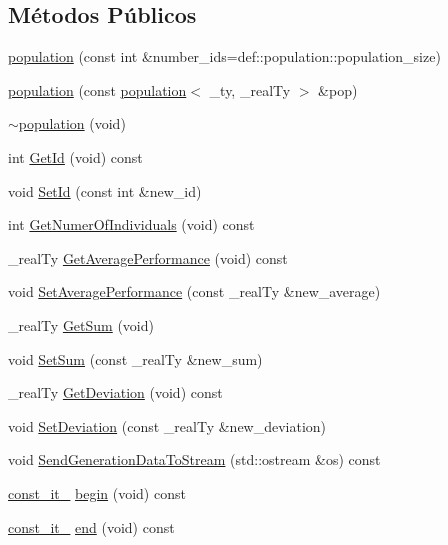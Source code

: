 \subsection*{Métodos Públicos}
\begin{DoxyCompactItemize}
\item 
\hyperlink{classpopulation_aa497c7bcf82ec82f15cf0ca41f29c153}{population} (const int \&number\_\-ids=def::population::population\_\-size)
\item 
\hyperlink{classpopulation_ab7b5dad1173b0da5b177e6253b66a071}{population} (const \hyperlink{classpopulation}{population}$<$ \_\-ty, \_\-realTy $>$ \&pop)
\item 
\hyperlink{classpopulation_a735c7c86f92155f0deb6034432086d37}{$\sim$population} (void)
\item 
int \hyperlink{classpopulation_a15aee31f3669a3819a025d0c88fd559b}{GetId} (void) const 
\item 
void \hyperlink{classpopulation_aa7803cea8fa30be9c9732d8e81f8aaf4}{SetId} (const int \&new\_\-id)
\item 
int \hyperlink{classpopulation_aa8d33d15eef1966482d052ff509bc638}{GetNumerOfIndividuals} (void) const 
\item 
\_\-realTy \hyperlink{classpopulation_a3c0a549de81a152a15f052e57f106a86}{GetAveragePerformance} (void) const 
\item 
void \hyperlink{classpopulation_a7fb6b0d19740560913aac2eb376c56fb}{SetAveragePerformance} (const \_\-realTy \&new\_\-average)
\item 
\_\-realTy \hyperlink{classpopulation_ac7e0fd101523d1f1db34ae3484a30bf3}{GetSum} (void)
\item 
void \hyperlink{classpopulation_a80e34ba9884327ddc5bafbaedd32014b}{SetSum} (const \_\-realTy \&new\_\-sum)
\item 
\_\-realTy \hyperlink{classpopulation_abe769cd333fa71228e6a89da1171fd93}{GetDeviation} (void) const 
\item 
void \hyperlink{classpopulation_ad0b1614ed94b9eb82a8ca0e24bdc603b}{SetDeviation} (const \_\-realTy \&new\_\-deviation)
\item 
void \hyperlink{classpopulation_a2ddcfb41305717b30051f0aa0a8e240c}{SendGenerationDataToStream} (std::ostream \&os) const 
\item 
\hyperlink{classpopulation_afcea3753ae2b2e0211f8fdc919c51a71}{const\_\-it\_\-} \hyperlink{classpopulation_a4751584859b70770ae44717a43f9ab95}{begin} (void) const 
\item 
\hyperlink{classpopulation_afcea3753ae2b2e0211f8fdc919c51a71}{const\_\-it\_\-} \hyperlink{classpopulation_a38318f9ca5c607490f4d6e92b54d8734}{end} (void) const 

\end{DoxyCompactItemize}
